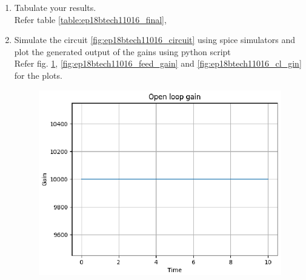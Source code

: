 \begin{enumerate}[label=\arabic*.,ref=\theenumi]

\item Tabulate your results.
\\
\solution Refer table \ref{table:ep18btech11016_final},

\begin{table}[!ht]
    \centering
    
    \caption{}
    \label{table:ep18btech11016_final}
\end{table}


\item Simulate the circuit \ref{fig:ep18btech11016_circuit} using spice simulators and plot the generated output of the gains using python script
\\
\solution Refer fig. \ref{fig:ep18btech11016_ol_gain}, \ref{fig:ep18btech11016_feed_gain} and \ref{fig:ep18btech11016_cl_gin} for the plots.

\renewcommand{\thefigure}{\theenumi.\arabic{figure}}
\begin{figure}[!ht]
	\centering
    \includegraphics[width=\columnwidth]{./figs/ep18btech11016/ep18btech11016_ol_gain.eps}
\caption{}
\label{fig:ep18btech11016_ol_gain}
\end{figure}


\end{enumerate}
